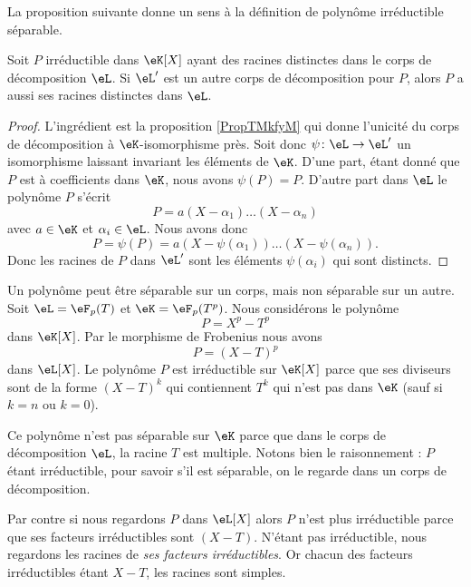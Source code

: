 La proposition suivante donne un sens à la définition de polynôme irréductible séparable.
\begin{proposition}
    Soit \( P\) irréductible dans \( \eK[X]\) ayant des racines distinctes dans le corps de décomposition \( \eL\). Si \( \eL'\) est un autre corps de décomposition pour \( P\), alors \( P\) a aussi ses racines distinctes dans \( \eL\).
\end{proposition}

\begin{proof}
    L'ingrédient est la proposition \ref{PropTMkfyM} qui donne l'unicité du corps de décomposition à \( \eK\)-isomorphisme près. Soit donc \( \psi\colon \eL\to \eL'\) un isomorphisme laissant invariant les éléments de \( \eK\). D'une part, étant donné que \( P\) est à coefficients dans \( \eK\), nous avons \( \psi(P)=P\). D'autre part dans \( \eL\) le polynôme \( P\) s'écrit
    \begin{equation}
        P=a(X-\alpha_1)\ldots (X-\alpha_n)
    \end{equation}
    avec \( a\in \eK\) et \( \alpha_i\in \eL\). Nous avons donc
    \begin{equation}
        P=\psi(P)=a(X-\psi(\alpha_1))\ldots (X-\psi(\alpha_n)).
    \end{equation}
    Donc les racines de \( P\) dans \( \eL'\) sont les éléments \( \psi(\alpha_i)\) qui sont distincts.
\end{proof}

\begin{example}
    Un polynôme peut être séparable sur un corps, mais non séparable sur un autre. Soit \( \eL=\eF_p(T)\) et \( \eK=\eF_p(T^p)\). Nous considérons le polynôme
    \begin{equation}
        P=X^p-T^p
    \end{equation}
    dans \( \eK[X]\). Par le morphisme de Frobenius nous avons 
    \begin{equation}
        P=(X-T)^p
    \end{equation}
    dans \( \eL[X]\). Le polynôme \( P\) est irréductible sur \( \eK[X]\) parce que ses diviseurs sont de la forme \( (X-T)^k\) qui contiennent \( T^k\) qui n'est pas dans \( \eK\) (sauf si \( k=n\) ou \( k=0\)).

    Ce polynôme n'est pas séparable sur \( \eK\) parce que dans le corps de décomposition \( \eL\), la racine \( T\) est multiple. Notons bien le raisonnement : \( P\) étant irréductible, pour savoir s'il est séparable, on le regarde dans un corps de décomposition.

    Par contre si nous regardons \( P\) dans \( \eL[X]\) alors \( P\) n'est plus irréductible parce que ses facteurs irréductibles sont \( (X-T)\). N'étant pas irréductible, nous regardons les racines de \emph{ses facteurs irréductibles}. Or chacun des facteurs irréductibles étant \( X-T\), les racines sont simples.
\end{example}

